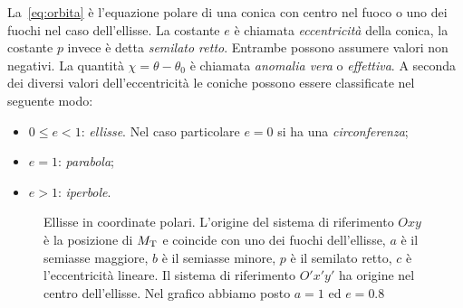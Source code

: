 La~\eqref{eq:orbita} è l'equazione polare di una conica con centro nel fuoco o
uno dei fuochi nel caso dell'ellisse. La costante $e$ è chiamata
\emph{eccentricità} della conica, la costante $p$ invece è detta
\emph{semilato retto}. Entrambe possono assumere valori non negativi. La
quantità $\chi = \theta - \theta_0$ è chiamata \emph{anomalia vera} o
\emph{effettiva}. A seconda dei diversi valori dell'eccentricità le coniche
possono essere classificate nel seguente modo:
\begin{itemize}
\item $0\leq e<1$: \emph{ellisse}. Nel caso particolare $e=0$ si ha una
  \emph{circonferenza};
\item $e=1$: \emph{parabola};
\item $e>1$: \emph{iperbole}.
\end{itemize}
\begin{figure}
  \centering
  \caption[Ellisse in coordinate polari]{Ellisse in coordinate polari. L'origine
    del sistema di riferimento $Oxy$ è la posizione di $M_\textup{T}$ e coincide
    con uno dei fuochi dell'ellisse, $a$ è il semiasse maggiore, $b$ è il
    semiasse minore, $p$ è il semilato retto, $c$ è l'eccentricità lineare. Il
    sistema di riferimento $O'x'y'$ ha origine nel centro dell'ellisse. Nel
    grafico abbiamo posto $a=1$ ed $e=0.8$}
  \label{fig:ellisse}
\end{figure}

